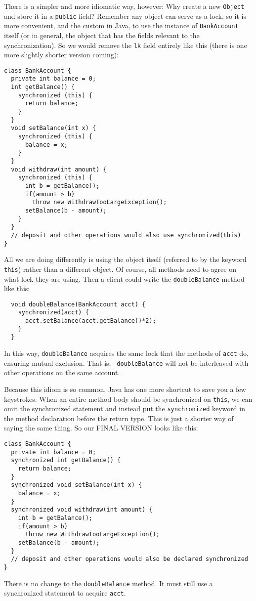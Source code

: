 \documentclass[10pt]{article}
\begin{document}
There is a simpler and more idiomatic way, however: Why create a new
{\tt Object} and store it in a {\tt public} field?  Remember any
object can serve as a lock, so it is more convenient, and the custom
in Java, to use the instance of {\tt BankAccount} itself (or in
general, the object that has the fields relevant to the
synchronization).  So we would remove the {\tt lk} field entirely like
this (there is one more slightly shorter version coming):
\begin{verbatim}
class BankAccount {
  private int balance = 0;
  int getBalance() { 
    synchronized (this) { 
      return balance; 
    } 
  }
  void setBalance(int x) { 
    synchronized (this) { 
      balance = x; 
    } 
  } 
  void withdraw(int amount) {
    synchronized (this) {
      int b = getBalance();
      if(amount > b)
        throw new WithdrawTooLargeException();
      setBalance(b - amount);
    } 
  }
  // deposit and other operations would also use synchronized(this)
}
\end{verbatim}
All we are doing differently is using the object itself (referred to
by the keyword {\tt this}) rather than a different object.  Of course,
all methods need to agree on what lock they are using.  Then a client
could write the {\tt doubleBalance} method like this:
\begin{verbatim}
  void doubleBalance(BankAccount acct) {
    synchronized(acct) {
      acct.setBalance(acct.getBalance()*2);
    }
  }
\end{verbatim}
In this way, {\tt doubleBalance} acquires the same lock that the
methods of {\tt acct} do, ensuring mutual exclusion.  That is, {\tt
  doubleBalance} will not be interleaved with other operations on the
same account.

Because this idiom is so common, Java has one more shortcut to save
you a few keystrokes.  When an entire method body should be
synchronized on {\tt this}, we can omit the synchronized statement and
instead put the {\tt synchronized} keyword in the method declaration
before the return type.  This is just a shorter way of saying the same
thing.  So our FINAL VERSION looks like this:
\begin{verbatim}
class BankAccount {
  private int balance = 0;
  synchronized int getBalance() { 
    return balance; 
  }
  synchronized void setBalance(int x) { 
    balance = x; 
  } 
  synchronized void withdraw(int amount) {
    int b = getBalance();
    if(amount > b)
      throw new WithdrawTooLargeException();
    setBalance(b - amount);
  }
  // deposit and other operations would also be declared synchronized
}
\end{verbatim}
There is no change to the {\tt doubleBalance} method.  It must still
use a synchronized statement to acquire {\tt acct}.
\end{document}
